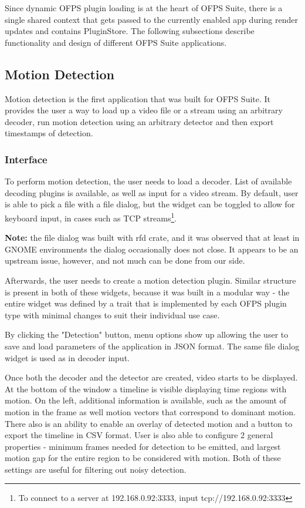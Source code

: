 \documentclass[11pt,english]{report}
\begin{document}
Since dynamic OFPS plugin loading is at the heart of OFPS Suite, there is a single shared context that gets passed to the currently enabled app during render updates and contains PluginStore. The following subsections describe functionality and design of different OFPS Suite applications.

\subsection{Motion Detection}

Motion detection is the first application that was built for OFPS Suite. It provides the user a way to load up a video file or a stream using an arbitrary decoder, run motion detection using an arbitrary detector and then export timestamps of detection.

\subsubsection{Interface}

To perform motion detection, the user needs to load a decoder. List of available decoding plugins is available, as well as input for a video stream. By default, user is able to pick a file with a file dialog, but the widget can be toggled to allow for keyboard input, in cases such as TCP streams\footnote{To connect to a server at 192.168.0.92:3333, input tcp://192.168.0.92:3333}.

\textbf{Note:} the file dialog was built with rfd crate, and it was observed that at least in GNOME environments the dialog occasionally does not close. It appears to be an upstream issue, however, and not much can be done from our side.

Afterwards, the user needs to create a motion detection plugin. Similar structure is present in both of these widgets, because it was built in a modular way - the entire widget was defined by a trait that is implemented by each OFPS plugin type with minimal changes to suit their individual use case. 

By clicking the "Detection" button, menu options show up allowing the user to save and load parameters of the application in JSON format. The same file dialog widget is used as in decoder input.

Once both the decoder and the detector are created, video starts to be displayed. At the bottom of the window a timeline is visible displaying time regions with motion. On the left, additional information is available, such as the amount of motion in the frame as well motion vectors that correspond to dominant motion. There also is an ability to enable an overlay of detected motion and a button to export the timeline in CSV format. User is also able to configure 2 general properties - minimum frames needed for detection to be emitted, and largest motion gap for the entire region to be considered with motion. Both of these settings are useful for filtering out noisy detection.
\end{document}
